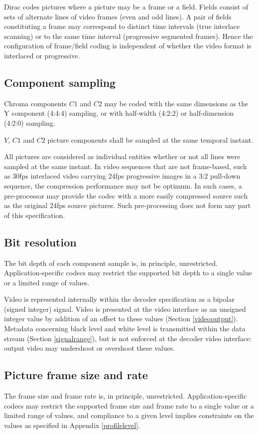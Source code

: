 Dirac codes pictures where a picture may be a frame or a field. Fields consist 
of sets of alternate lines of video frames (even and odd lines). A pair of 
fields constituting a frame may correspond to distinct time intervals (true
interlace scanning) or to the same time interval (progressive segmented frames).
 Hence the configuration of frame/field coding is independent of whether the 
video format is interlaced or progressive.

\subsection{Component sampling}

Chroma components $C1$ and $C2$ may be coded with the same dimensions as the Y
 component (4:4:4) sampling, or with half-width (4:2:2) or half-dimension 
(4:2:0) sampling.

$Y$, $C1$ and $C2$ picture components shall be sampled at the same temporal
instant.

\begin{informative}
All pictures are considered as individual entities whether or not all lines were
 sampled at the same instant. In video sequences that are not frame-based, such 
as 30fps interlaced video carrying 24fps progressive images in a 3:2 
pull-down sequence, the compression performance may not be optimum. In such 
cases, a pre-processor may provide the codec with a more easily compressed 
source such as the original 24fps source pictures. Such pre-processing does not form any part of this specification.
\end{informative}

\subsection{Bit resolution}

The bit depth of each component sample is, in principle, unrestricted. 
Application-specific codecs may restrict the supported bit depth to a single 
value or a limited range of values.

Video is represented internally within the decoder specification as a bipolar
 (signed integer) signal. Video is presented at the video interface as an 
unsigned integer value by addition of an offset to these values 
(Section \ref{videooutput}). Metadata concerning black level and white level 
is transmitted
 within the data stream (Section \ref{signalrange}), but is not enforced at the
decoder video interface: output video may undershoot or overshoot these values.

\subsection{Picture frame size and rate}

The frame size and frame rate is, in principle, unrestricted. 
Application-specific codecs may restrict the supported frame size and frame rate
 to a single value or a limited range of values, and compliance to a given level
 implies constraints on the values as specified in Appendix \ref{profilelevel}.

